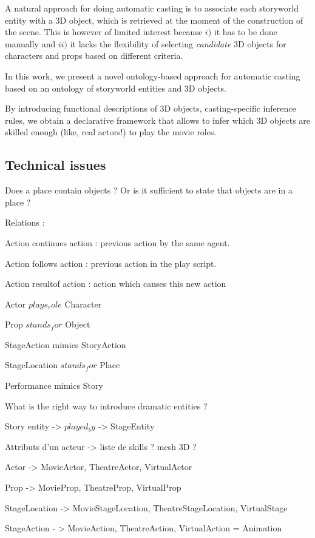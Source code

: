 \documentclass[a4paper,UKenglish]{oasics}
\begin{document}
\smallskip
A natural approach for doing automatic casting is to associate each storyworld entity with a 3D object, which is retrieved at the moment of the construction of the scene.
This is however of limited interest because $i)$ it has to be done manually and $ii)$ it lacks the flexibility of selecting \emph{candidate} 3D objects for characters and props based on different criteria. 

\smallskip
In this work, we present a novel ontology-based approach for automatic casting based on an ontology of storyworld entities and 3D objects.

By introducing functional descriptions of 3D objects, casting-specific inference rules, we obtain a declarative framework that allows to infer which 3D objects are skilled enough (like, real actors!) to play the movie roles.


\subsection{Technical issues}
Does a place contain objects ? Or is it sufficient to state that objects are in a place ?

Relations :
 
Action continues action : previous action by the same agent.

Action follows action : previous action in the play script.

Action resultof action : action which causes this new action

Actor $plays_role$ Character

Prop $stands_for$ Object

StageAction mimics StoryAction

StageLocation  $stands_for$ Place

Performance mimics Story

What is the right way to introduce dramatic entities ? 



Story entity -> $played_by$ -> StageEntity

Attributs d'un acteur -> liste de skills ? mesh 3D ? 


Actor -> MovieActor, TheatreActor, VirtualActor

Prop -> MovieProp, TheatreProp, VirtualProp

StageLocation -> MovieStageLocation, TheatreStageLocation, VirtualStage

StageAction - > MovieAction, TheatreAction, VirtualAction = Animation
  
\end{document}
